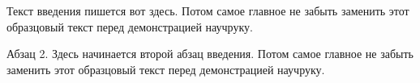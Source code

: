 \label{sec:into}

Текст введения пишется вот здесь. Потом самое главное не забыть заменить этот образцовый текст перед демонстрацией научруку.

Абзац 2. Здесь начинается второй абзац введения. Потом самое главное не забыть заменить этот образцовый текст перед демонстрацией научруку.
